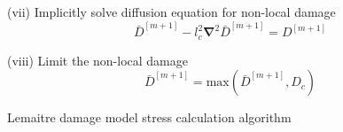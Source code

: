 \documentclass[sn-mathphys,Numbered]{sn-jnl}%
\newcommand{\bb}{\boldsymbol}
\begin{document}
\begin{algorithm}[htbp]
(vii) Implicitly solve diffusion equation for non-local damage
\begin{equation}
	\bar{D}^{[m+1]} -  l_c^2 \bb{\nabla}^2 \bar{D}^{[m+1]} = D^{[m+1]} \nonumber
\end{equation}

(viii) Limit the non-local damage
\begin{equation}
	\bar{D}^{[m+1]} = \text{max} \left( \bar{D}^{[m+1]} , D_c \right) \nonumber
\end{equation}

\caption{Lemaitre damage model stress calculation algorithm}
\end{algorithm}
\normalsize

\end{document}
